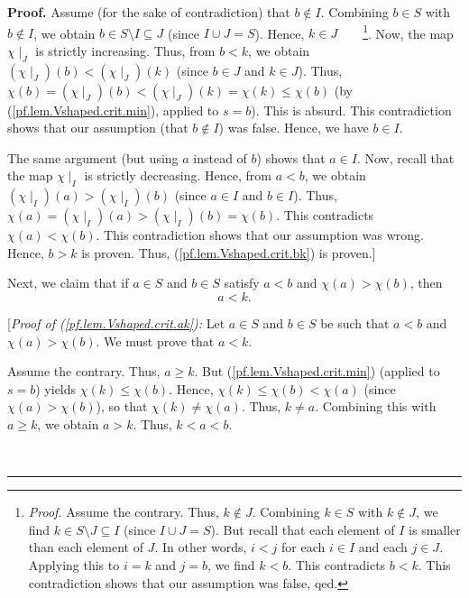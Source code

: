 \documentclass[numbers=enddot,12pt,final,onecolumn,notitlepage]{scrartcl}%
\theoremstyle{definition}
\newenvironment{proof}[1][Proof]{\noindent\textbf{#1.} }{\ \rule{0.5em}{0.5em}}
\newenvironment{verlong}{}{}
\begin{document}
\begin{verlong}
\begin{proof}
Assume (for the sake of contradiction) that $b\notin I$. Combining $b\in S$
with $b\notin I$, we obtain $b\in S\setminus I\subseteq J$ (since $I\cup
J=S$). Hence, $k\in J$\ \ \ \ \footnote{\textit{Proof.} Assume the contrary.
Thus, $k\notin J$. Combining $k\in S$ with $k\notin J$, we find $k\in
S\setminus J\subseteq I$ (since $I\cup J=S$). But recall that each element of
$I$ is smaller than each element of $J$. In other words, $i<j$ for each $i\in
I$ and each $j\in J$. Applying this to $i=k$ and $j=b$, we find $k<b$. This
contradicts $b<k$. This contradiction shows that our assumption was false,
qed.}. Now, the map $\chi\mid_{J}$ is strictly increasing. Thus, from $b<k$,
we obtain $\left(  \chi\mid_{J}\right)  \left(  b\right)  <\left(  \chi
\mid_{J}\right)  \left(  k\right)  $ (since $b\in J$ and $k\in J$). Thus,
$\chi\left(  b\right)  =\left(  \chi\mid_{J}\right)  \left(  b\right)
<\left(  \chi\mid_{J}\right)  \left(  k\right)  =\chi\left(  k\right)
\leq\chi\left(  b\right)  $ (by (\ref{pf.lem.Vshaped.crit.min}), applied to
$s=b$). This is absurd. This contradiction shows that our assumption (that
$b\notin I$) was false. Hence, we have $b\in I$.

The same argument (but using $a$ instead of $b$) shows that $a\in I$. Now,
recall that the map $\chi\mid_{I}$ is strictly decreasing. Hence, from $a<b$,
we obtain $\left(  \chi\mid_{I}\right)  \left(  a\right)  >\left(  \chi
\mid_{I}\right)  \left(  b\right)  $ (since $a\in I$ and $b\in I$). Thus,
$\chi\left(  a\right)  =\left(  \chi\mid_{I}\right)  \left(  a\right)
>\left(  \chi\mid_{I}\right)  \left(  b\right)  =\chi\left(  b\right)  $. This
contradicts $\chi\left(  a\right)  <\chi\left(  b\right)  $. This
contradiction shows that our assumption was wrong. Hence, $b>k$ is proven.
Thus, (\ref{pf.lem.Vshaped.crit.bk}) is proven.]

Next, we claim that if $a\in S$ and $b\in S$ satisfy $a<b$ and $\chi\left(
a\right)  >\chi\left(  b\right)  $, then%
\begin{equation}
a<k. \label{pf.lem.Vshaped.crit.ak}%
\end{equation}


[\textit{Proof of (\ref{pf.lem.Vshaped.crit.ak}):} Let $a\in S$ and $b\in S$
be such that $a<b$ and $\chi\left(  a\right)  >\chi\left(  b\right)  $. We
must prove that $a<k$.

Assume the contrary. Thus, $a\geq k$. But (\ref{pf.lem.Vshaped.crit.min})
(applied to $s=b$) yields $\chi\left(  k\right)  \leq\chi\left(  b\right)  $.
Hence, $\chi\left(  k\right)  \leq\chi\left(  b\right)  <\chi\left(  a\right)
$ (since $\chi\left(  a\right)  >\chi\left(  b\right)  $), so that
$\chi\left(  k\right)  \neq\chi\left(  a\right)  $. Thus, $k\neq a$. Combining
this with $a\geq k$, we obtain $a>k$. Thus, $k<a<b$.


\end{proof}
\end{verlong}
\end{document}
